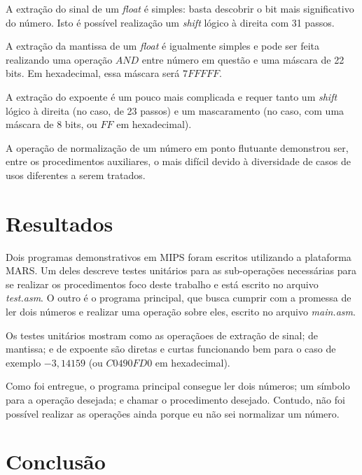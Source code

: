 \documentclass[12pt, a4paper, twoside]{article}
\begin{document}
A extração do sinal de um \textit{float} é simples: basta descobrir o bit mais
significativo do número. Isto é possível realização um \textit{shift} lógico à
direita com 31 passos.

A extração da mantissa de um \textit{float} é igualmente simples e pode ser
feita realizando uma operação $AND$ entre número em questão e uma máscara de 22
bits. Em hexadecimal, essa máscara será $7FFFFF$.

A extração do expoente é um pouco mais complicada e requer tanto um
\textit{shift} lógico à direita (no caso, de 23 passos) e um mascaramento (no
caso, com uma máscara de 8 bits, ou $FF$ em hexadecimal).



A operação de normalização de um número em ponto flutuante demonstrou ser,
entre os procedimentos auxiliares, o mais difícil devido à diversidade de casos
de usos diferentes a serem tratados.

\section{Resultados}

Dois programas demonstrativos em MIPS foram escritos utilizando a plataforma
MARS. Um deles descreve testes unitários para as sub-operações necessárias
para se realizar os procedimentos foco deste trabalho e está escrito no arquivo
\textit{test.asm}. O outro é o programa principal, que busca cumprir com a
promessa de ler dois números e realizar uma operação sobre eles, escrito no
arquivo \textit{main.asm}.

Os testes unitários mostram como as operaçãoes de extração de sinal; de
mantissa; e de expoente são diretas e curtas funcionando bem para o caso de
exemplo $-3,14159$ (ou $C0490FD0$ em hexadecimal).

Como foi entregue, o programa principal consegue ler dois números; um símbolo
para a operação desejada; e chamar o procedimento desejado. Contudo, não foi
possível realizar as operações ainda porque eu não sei normalizar um número.


\section{Conclusão}
\end{document}

